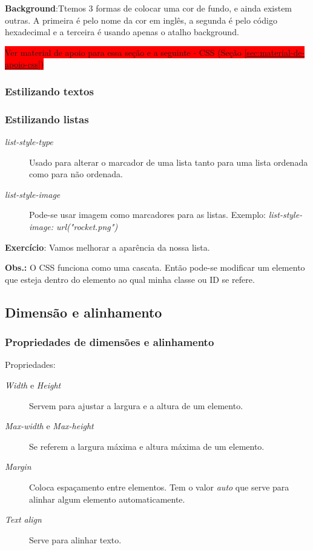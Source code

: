 \documentclass[12pt,a4paper]{article}
\begin{document}
	\textbf{Background}:Ttemos 3 formas de colocar uma cor de fundo, e ainda existem outras. A primeira é pelo nome da cor em inglês, a segunda é pelo código hexadecimal e a terceira é usando apenas o atalho background.
	
	\colorbox{red}{Ver material de apoio para essa seção e a seguinte - CSS (Seção \ref{sec:material-de-apoio-css})}
	
	\subsubsection{Estilizando textos}
	
	\subsubsection{Estilizando listas}
	
	\begin{description}
		\item[\textit{list-style-type}] Usado para alterar o marcador de uma lista tanto para uma lista ordenada como para não ordenada.
		
		\item[\textit{list-style-image}] Pode-se usar imagem como marcadores para as listas. Exemplo: \textit{list-style-image: url("rocket.png")} 
	\end{description}

	\textbf{Exercício}: Vamos melhorar a aparência da nossa lista.
	
	\textbf{Obs.:} O CSS funciona como uma cascata. Então pode-se modificar um elemento que esteja dentro do elemento ao qual minha classe ou ID se refere.
	
	\subsection{Dimensão e alinhamento}
	\subsubsection{Propriedades de dimensões e alinhamento}
	
	Propriedades:
	
	\begin{description}
		\item[\textit{Width} e \textit{Height}] Servem para ajustar a largura e a altura de um elemento.
		
		\item[\textit{Max-width} e \textit{Max-height}] Se referem a largura máxima e altura máxima de um elemento.
		
		\item[\textit{Margin}] Coloca espaçamento entre elementos. Tem o valor \textit{auto} que serve para alinhar algum elemento automaticamente.
		
		\item[\textit{Text align}] Serve para alinhar texto.
	\end{description}
\end{document}
